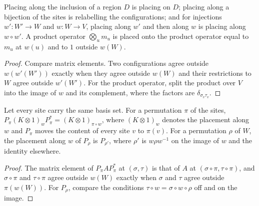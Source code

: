 \begin{lemma}
    \label{lem:sites_place_along_composition}
    \leanok
    Placing along the inclusion of a region $D$ is placing on $D$; placing along a bijection
    of the sites is relabelling the configurations; and for injections $w'\colon W'\to W$
    and $w\colon W\to V$, placing along $w'$ and then along $w$ is placing along $w\circ w'$.
    A product operator $\bigotimes_um_u$ is placed onto the product operator equal to $m_u$
    at $w(u)$ and to $1$ outside $w(W)$.
\end{lemma}
\begin{proof}\leanok
    Compare matrix elements. Two configurations agree outside $w(w'(W'))$ exactly when they
    agree outside $w(W)$ and their restrictions to $W$ agree outside $w'(W')$. For the product
    operator, split the product over $V$ into the image of $w$ and its complement, where
    the factors are $\delta_{\sigma_v\tau_v}$.
\end{proof}

\begin{lemma}
    \label{lem:sites_place_along_permutation}
    \leanok
    Let every site carry the same basis set. For a permutation $\pi$ of the sites,
    $P_\pi(K\otimes1)_wP_\pi^*=(K\otimes1)_{\pi\circ w}$, where $(K\otimes1)_w$ denotes the
    placement along $w$ and $P_\pi$ moves the content of every site $v$ to $\pi(v)$. For a
    permutation $\rho$ of $W$, the placement along $w$ of $P_\rho$ is $P_{\rho'}$, where
    $\rho'$ is $w\rho w^{-1}$ on the image of $w$ and the identity elsewhere.
\end{lemma}
\begin{proof}\leanok
    The matrix element of $P_\pi AP_\pi^*$ at $(\sigma,\tau)$ is that of $A$ at
    $(\sigma\circ\pi,\tau\circ\pi)$, and $\sigma\circ\pi$ and $\tau\circ\pi$ agree outside
    $w(W)$ exactly when $\sigma$ and $\tau$ agree outside $\pi(w(W))$. For $P_\rho$, compare
    the conditions $\tau\circ w=\sigma\circ w\circ\rho$ off and on the image.
\end{proof}

